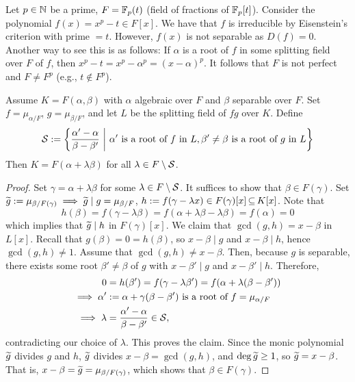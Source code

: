 \documentclass[11pt]{book}
\theoremstyle{definition}   \newtheorem{defn}[counter]{Definition} %
\newcommand{\bs}{\setminus}   \newcommand{\A}{\mathcal{A}}   \newcommand{\sy}{\textnormal{Syl}}   \newcommand{\size}[1]{\left| #1 \right|}
\newcommand{\vs}{\vspace{8pt}}   \newcommand{\hs}{\hspace{8pt}}
\numberwithin{counter}{chapter}
\begin{document}
\vs

\begin{example}
Let $p \in \operatorname{\mathbb{N}}$ be a prime, $F = \mathbb{F}_p(t)$ (field of fractions of $\mathbb{F}_p[t]$). Consider the polynomial $f(x) = x^p-t \in F[x]$. We have that $f$ is irreducible by Eisenstein's criterion with prime $= t$. However, $f(x)$ is not separable as $D(f) = 0$. Another way to see this is as follows: If $\alpha$ is a root of $f$ in some splitting field over $F$ of $f$, then $x^p-t = x^p-\alpha^p = (x-\alpha)^p$. It follows that $F$ is not perfect and $F \ne F^p$ (e.g., $t \notin F^p$). 
\end{example}

\vs

\begin{lemma}
Assume $K = F(\alpha,\beta)$ with $\alpha$ algebraic over $F$ and $\beta$ separable over $F$. Set $f = \mu_{\alpha/F}$, $g = \mu_{\beta/F}$, and let $L$ be the splitting field of $fg$ over $K$. Define
	\[\mathcal{S} := \left\{ \frac{\alpha'-\alpha}{\beta - \beta'} \ \bigg | \ \alpha' \textnormal{ is a root of } f \textnormal{ in } L, \beta' \ne \beta \textnormal{ is a root of } g \textnormal{ in } L \right\} \]
Then $K = F(\alpha + \lambda \beta)$ for all $\lambda \in F \bs \mc{S}$. 
\end{lemma}

\begin{proof}
Set $\gamma = \alpha + \lambda \beta$ for some $\lambda \in F \bs \mc{S}$. It suffices to show that $\beta \in F(\gamma)$. Set $\widetilde{g} := \mu_{\beta/F(\gamma)} \implies \widetilde{g} \mid g = \mu_{\beta/F}$, $h := f(\gamma - \lambda x) \in F(\gamma)[x] \operatorname{\subseteq} K[x]$. Note that 
	\[h(\beta) = f(\gamma - \lambda \beta) = f(\alpha + \lambda \beta - \lambda \beta) = f(\alpha) = 0 \]
which implies that $\widetilde{g} \mid h$ in $F(\gamma)[x]$. We claim that $\gcd(g,h) = x-\beta$ in $L[x]$. Recall that $g(\beta) = 0 = h(\beta)$, so $x - \beta \mid g$ and $x-\beta \mid h$, hence $\gcd(g,h) \ne 1$. Assume that $\gcd(g,h) \ne x-\beta$. Then, because $g$ is separable, there exists some root $\beta' \ne \beta$ of $g$ with $x-\beta' \mid g$ and $x-\beta' \mid h$. Therefore,
\begin{align*}
0 &= h(\beta') = f(\gamma-\lambda \beta') = f(\alpha + \lambda(\beta-\beta')) \\
\implies \alpha' &:= \alpha + \gamma(\beta - \beta') \textnormal{ is a root of } f = \mu_{\alpha/F} \\
\implies \lambda &= \frac{\alpha'-\alpha}{\beta - \beta'} \in \mathcal{S},
\end{align*}
contradicting our choice of $\lambda$. This proves the claim. Since the monic polynomial $\widetilde{g}$ divides $g$ and $h$, $\widetilde{g}$ divides $x-\beta = \gcd(g,h)$, and $\deg \widetilde{g} \geq 1$, so $\widetilde{g} = x-\beta$. That is, $x-\beta = \widetilde{g} = \mu_{\beta/F(\gamma)}$, which shows that $\beta \in F(\gamma)$. 
\end{proof}
\end{document}
